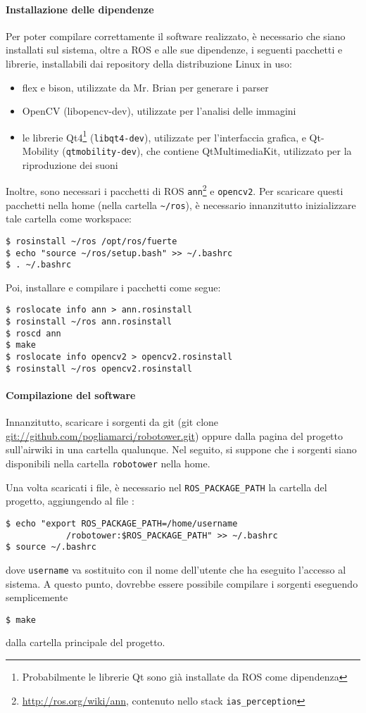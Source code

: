 \paragraph{Installazione delle dipendenze} Per poter compilare correttamente il software realizzato, è necessario che siano installati sul sistema, oltre a ROS e alle sue dipendenze, i seguenti pacchetti e librerie, installabili dai repository della distribuzione Linux in uso:
\begin{itemize}
\item flex e bison, utilizzate da Mr. Brian per generare i parser
\item OpenCV (libopencv-dev), utilizzate per l'analisi delle immagini
\item le librerie Qt4\footnote{Probabilmente le librerie Qt sono già installate da ROS come dipendenza} (\verb|libqt4-dev|), utilizzate per l'interfaccia grafica, e Qt-Mobility (\verb|qtmobility-dev|), che contiene QtMultimediaKit, utilizzato per la riproduzione dei suoni
\end{itemize}
Inoltre, sono necessari i pacchetti di ROS \verb|ann|\footnote{\url{http://ros.org/wiki/ann}, contenuto nello stack \texttt{ias\_perception}} e \verb|opencv2|. Per scaricare questi pacchetti nella home (nella cartella \verb|~/ros|), è necessario innanzitutto inizializzare tale cartella come workspace:
\begin{verbatim}
$ rosinstall ~/ros /opt/ros/fuerte
$ echo "source ~/ros/setup.bash" >> ~/.bashrc
$ . ~/.bashrc
\end{verbatim}
Poi, installare e compilare i pacchetti come segue:
\begin{verbatim}
$ roslocate info ann > ann.rosinstall
$ rosinstall ~/ros ann.rosinstall
$ roscd ann
$ make
$ roslocate info opencv2 > opencv2.rosinstall
$ rosinstall ~/ros opencv2.rosinstall
\end{verbatim}
\paragraph{Compilazione del software} Innanzitutto, scaricare i sorgenti da git (git clone \url{git://github.com/pogliamarci/robotower.git}) oppure dalla pagina del progetto sull'airwiki in una cartella qualunque. Nel seguito, si suppone che i sorgenti siano disponibili nella cartella \verb|robotower| nella home.

Una volta scaricati i file, è necessario nel \verb|ROS_PACKAGE_PATH| la cartella del progetto, aggiungendo al file :
\begin{verbatim}
$ echo "export ROS_PACKAGE_PATH=/home/username
            /robotower:$ROS_PACKAGE_PATH" >> ~/.bashrc
$ source ~/.bashrc
\end{verbatim}
dove \verb|username| va sostituito con il nome dell'utente che ha eseguito l'accesso al sistema.
A questo punto, dovrebbe essere possibile compilare i sorgenti eseguendo semplicemente
\begin{verbatim}
$ make
\end{verbatim}
dalla cartella principale del progetto.

